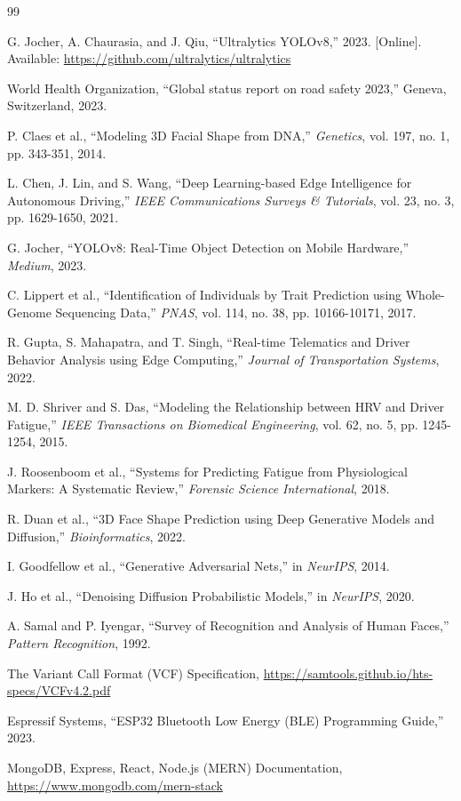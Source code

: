 \documentclass[conference]{IEEEtran}
\begin{document}

\begin{thebibliography}{99}

 G. Jocher, A. Chaurasia, and J. Qiu, ``Ultralytics YOLOv8,'' 2023. [Online]. Available: \url{https://github.com/ultralytics/ultralytics}

 World Health Organization, ``Global status report on road safety 2023,'' Geneva, Switzerland, 2023.

 P. Claes et al., ``Modeling 3D Facial Shape from DNA,'' \emph{Genetics}, vol. 197, no. 1, pp. 343-351, 2014.

 L. Chen, J. Lin, and S. Wang, ``Deep Learning-based Edge Intelligence for Autonomous Driving,'' \emph{IEEE Communications Surveys \& Tutorials}, vol. 23, no. 3, pp. 1629-1650, 2021.

 G. Jocher, ``YOLOv8: Real-Time Object Detection on Mobile Hardware,'' \emph{Medium}, 2023.

 C. Lippert et al., ``Identification of Individuals by Trait Prediction using Whole-Genome Sequencing Data,'' \emph{PNAS}, vol. 114, no. 38, pp. 10166-10171, 2017.

 R. Gupta, S. Mahapatra, and T. Singh, ``Real-time Telematics and Driver Behavior Analysis using Edge Computing,'' \emph{Journal of Transportation Systems}, 2022.

 M. D. Shriver and S. Das, ``Modeling the Relationship between HRV and Driver Fatigue,'' \emph{IEEE Transactions on Biomedical Engineering}, vol. 62, no. 5, pp. 1245-1254, 2015.

 J. Roosenboom et al., ``Systems for Predicting Fatigue from Physiological Markers: A Systematic Review,'' \emph{Forensic Science International}, 2018.

 R. Duan et al., ``3D Face Shape Prediction using Deep Generative Models and Diffusion,'' \emph{Bioinformatics}, 2022.

 I. Goodfellow et al., ``Generative Adversarial Nets,'' in \emph{NeurIPS}, 2014.

 J. Ho et al., ``Denoising Diffusion Probabilistic Models,'' in \emph{NeurIPS}, 2020.

 A. Samal and P. Iyengar, ``Survey of Recognition and Analysis of Human Faces,'' \emph{Pattern Recognition}, 1992.

 The Variant Call Format (VCF) Specification, \url{https://samtools.github.io/hts-specs/VCFv4.2.pdf}

 Espressif Systems, ``ESP32 Bluetooth Low Energy (BLE) Programming Guide,'' 2023.

 MongoDB, Express, React, Node.js (MERN) Documentation, \url{https://www.mongodb.com/mern-stack}

\end{thebibliography}
\balance
\end{document}
